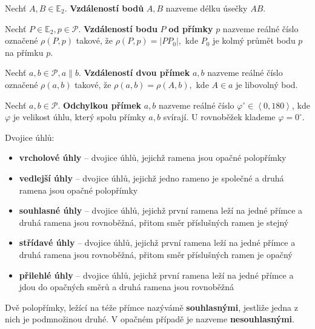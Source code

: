 \begin{definition}
  Nechť $A,B\in \mathbb E_2$. \textbf{Vzdáleností bodů} $A,B$ nazveme délku úsečky $AB.$
\end{definition}


\begin{definition}
  Nechť $P\in \mathbb E_2, p \in \mathscr P.$ \textbf{Vzdáleností bodu} $P$ \textbf{od přímky} $p$ nazveme reálné číslo označené $\rho(P,p)$ takové, že $\rho(P,p)=|PP_0|,$ kde $P_0$ je kolmý průmět bodu $p$ na přímku $p$.
\end{definition}

\begin{definition}
  Nechť $a,b \in \mathscr P, a \parallel b.$ \textbf{Vzdáleností dvou přímek} $a,b$ nazveme reálné číslo označené $\rho(a,b)$ takové, že $\rho(a,b)=\rho(A,b),$ kde $A\in a$ je libovolný bod.
\end{definition}

\begin{definition}
  Nechť $a,b\in \mathscr P.$ \textbf{Odchylkou přímek} $a,b$ nazveme reálné číslo $\varphi^\circ\in \left <0, 180\right>$, kde $\varphi$ je velikost úhlu, který spolu přímky $a,b$ svírají. U rovnoběžek klademe $\varphi = 0^\circ.$
\end{definition}

\begin{definition}
  Dvojice úhlů:
  \begin{itemize}
    \item \textbf{vrcholové úhly} -- dvojice úhlů, jejichž ramena jsou opačné polopřímky
    \item \textbf{vedlejší úhly} --	dvojice úhlů, jejichž jedno rameno je společné a druhá ramena jsou opačné polopřímky
    \item \textbf{souhlasné úhly} -- dvojice úhlů, jejichž první ramena leží na jedné přímce a druhá ramena jsou rovnoběžná, přitom směr příslušných ramen je stejný
    \item \textbf{střídavé úhly}	-- dvojice úhlů, jejichž první ramena leží na jedné přímce a druhá ramena jsou rovnoběžná, přitom směr příslušných ramen je opačný
    \item \textbf{přilehlé úhly} -- dvojice úhlů, jejichž první ramena leží na jedné přímce a jdou do opačných směrů a druhá ramena jsou rovnoběžná
  \end{itemize}
\end{definition}

\begin{definition}
  Dvě polopřímky, ležící na téže přímce nazývámě \textbf{souhlasnými}, jestliže jedna z nich je podmnožinou druhé. V opačném případě je nazveme \textbf{nesouhlasnými}.
\end{definition}

